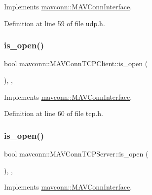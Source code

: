 Implements \mbox{\hyperlink{group__mavconn_ga135638c7c953c50bee3143a9e2b35416}{mavconn\+::\+M\+A\+V\+Conn\+Interface}}.



Definition at line 59 of file udp.\+h.

\mbox{\label{group__mavconn_gadcabe763ecf8fc00e123fcf78af9eaf4}} 
\subsubsection{\texorpdfstring{is\_open()}{is\_open()}\hspace{0.1cm}{\footnotesize\ttfamily [3/5]}}
{\footnotesize\ttfamily bool mavconn\+::\+M\+A\+V\+Conn\+T\+C\+P\+Client\+::is\+\_\+open (\begin{DoxyParamCaption}{ }\end{DoxyParamCaption})\hspace{0.3cm}{\ttfamily [inline]}, {\ttfamily [override]}, {\ttfamily [virtual]}}



Implements \mbox{\hyperlink{group__mavconn_ga135638c7c953c50bee3143a9e2b35416}{mavconn\+::\+M\+A\+V\+Conn\+Interface}}.



Definition at line 60 of file tcp.\+h.

\mbox{\label{group__mavconn_ga7bcb8a571a040f61ad2b61f002edc381}} 
\subsubsection{\texorpdfstring{is\_open()}{is\_open()}\hspace{0.1cm}{\footnotesize\ttfamily [4/5]}}
{\footnotesize\ttfamily bool mavconn\+::\+M\+A\+V\+Conn\+T\+C\+P\+Server\+::is\+\_\+open (\begin{DoxyParamCaption}{ }\end{DoxyParamCaption})\hspace{0.3cm}{\ttfamily [inline]}, {\ttfamily [override]}, {\ttfamily [virtual]}}



Implements \mbox{\hyperlink{group__mavconn_ga135638c7c953c50bee3143a9e2b35416}{mavconn\+::\+M\+A\+V\+Conn\+Interface}}.



